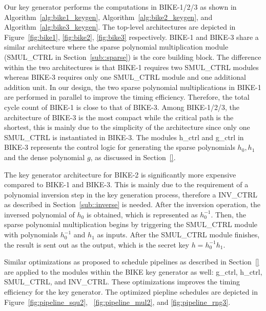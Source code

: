 \documentclass[runningheads]{llncs}
\begin{document}
Our key generator performs the computations in BIKE-1/2/3 as shown in Algorithm~\ref{alg:bike1_keygen}, Algorithm~\ref{alg:bike2_keygen}, and Algorithm~\ref{alg:bike3_keygen}. The top-level architectures are depicted in Figure~\ref{fig:bike1}, \ref{fig:bike2}, \ref{fig:bike3}
respectively. 
BIKE-1 and BIKE-3 share a similar architecture 
where the sparse polynomial multiplication module 
(SMUL\_CTRL in Section~\ref{sub::sparse}) is the core building block. 
The difference within the two architectures is that 
BIKE-1 requires two SMUL\_CTRL modules 
whereas BIKE-3 requires only one SMUL\_CTRL module and one additional
addition unit. 
In our design, the two sparse polynomial multiplications 
in BIKE-1 are performed in parallel to improve the 
timing efficiency. 
Therefore, the total cycle count of BIKE-1 
is close to that of BIKE-3. 
Among BIKE-1/2/3, the architecture of BIKE-3 is 
the most compact while the critical path is the shortest,
this is mainly due to the simplicity of the architecture
since only one SMUL\_CTRL is instantiated in BIKE-3. 
The modules h\_ctrl and g\_ctrl in BIKE-3 represents the
control logic for
generating the sparse polynomials $h_0,h_1$ and 
the dense polynomial $g$, as discussed in Section~\ref{}.

The key generator architecture for BIKE-2 
is significantly more expensive compared to 
BIKE-1 and BIKE-3.
This is mainly due to the requirement of a
polynomial inversion step in the key generation process,
therefore a INV\_CTRL as described in Section~\ref{sub::inverse} is needed. 
After the inversion operation, the inversed polynomial of
$h_0$ is obtained, which is represented as $h_0^{-1}$.
Then, the sparse polynomial multiplication begins
by triggering the SMUL\_CTRL module with polynomials
$h_0^{-1}$ and $h_1$ as inputs. 
After the SMUL\_CTRL module finishes,
the result is sent out as the output,
which is the secret key $h=h_0^{-1}h_1$.

Similar optimizations as proposed to schedule pipelines
as described in Section~\ref{} are applied to the 
modules within the BIKE key generator as well: 
g\_ctrl, h\_ctrl, SMUL\_CTRL, and INV\_CTRL.
These optimizations improves the timing efficiency for the
key generator. 
The optimized piepline schedules are depicted in Figure~\ref{fig:pipeline_squ2}, 
~\ref{fig:pipeline_mul2}, and \ref{fig:pipeline_rng3}. 
\end{document}
